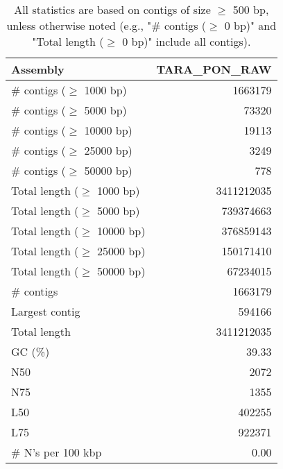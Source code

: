 \documentclass[12pt,a4paper]{article}
\begin{document}
\begin{table}[ht]
\begin{center}
\caption{All statistics are based on contigs of size $\geq$ 500 bp, unless otherwise noted (e.g., "\# contigs ($\geq$ 0 bp)" and "Total length ($\geq$ 0 bp)" include all contigs).}
\begin{tabular}{|l*{1}{|r}|}
\hline
Assembly & TARA\_PON\_RAW \\ \hline
\# contigs ($\geq$ 1000 bp) & 1663179 \\ \hline
\# contigs ($\geq$ 5000 bp) & 73320 \\ \hline
\# contigs ($\geq$ 10000 bp) & 19113 \\ \hline
\# contigs ($\geq$ 25000 bp) & 3249 \\ \hline
\# contigs ($\geq$ 50000 bp) & 778 \\ \hline
Total length ($\geq$ 1000 bp) & 3411212035 \\ \hline
Total length ($\geq$ 5000 bp) & 739374663 \\ \hline
Total length ($\geq$ 10000 bp) & 376859143 \\ \hline
Total length ($\geq$ 25000 bp) & 150171410 \\ \hline
Total length ($\geq$ 50000 bp) & 67234015 \\ \hline
\# contigs & 1663179 \\ \hline
Largest contig & 594166 \\ \hline
Total length & 3411212035 \\ \hline
GC (\%) & 39.33 \\ \hline
N50 & 2072 \\ \hline
N75 & 1355 \\ \hline
L50 & 402255 \\ \hline
L75 & 922371 \\ \hline
\# N's per 100 kbp & 0.00 \\ \hline
\end{tabular}
\end{center}
\end{table}
\end{document}
